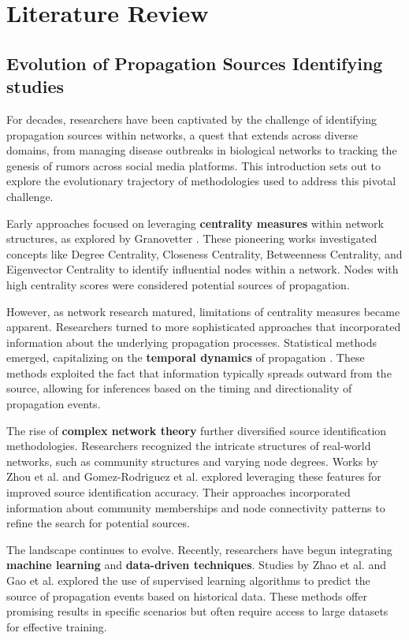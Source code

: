 \chapter{Literature Review}

\section{Evolution of Propagation Sources Identifying studies}
For decades, researchers have been captivated by the challenge of identifying propagation sources within networks, a quest that extends across diverse domains, from managing disease outbreaks in biological networks to tracking the genesis of rumors across social media platforms. This introduction sets out to explore the evolutionary trajectory of methodologies used to address this pivotal challenge.

Early approaches focused on leveraging \textbf{centrality measures} within network structures, as explored by Granovetter \cite{granovetter1973}. These pioneering works investigated concepts like Degree Centrality, Closeness Centrality, Betweenness Centrality, and Eigenvector Centrality to identify influential nodes within a network. Nodes with high centrality scores were considered potential sources of propagation.

However, as network research matured, limitations of centrality measures became apparent. Researchers turned to more sophisticated approaches that incorporated information about the underlying propagation processes. Statistical methods emerged, capitalizing on the \textbf{temporal dynamics} of propagation \cite{liu2011, chen2010}. These methods exploited the fact that information typically spreads outward from the source, allowing for inferences based on the timing and directionality of propagation events.

The rise of \textbf{complex network theory} further diversified source identification methodologies. Researchers recognized the intricate structures of real-world networks, such as community structures and varying node degrees. Works by Zhou et al. \cite{zhou2008} and Gomez-Rodriguez et al. \cite{gomez2011} explored leveraging these features for improved source identification accuracy. Their approaches incorporated information about community memberships and node connectivity patterns to refine the search for potential sources.

The landscape continues to evolve. Recently, researchers have begun integrating \textbf{machine learning} and \textbf{data-driven techniques}. Studies by Zhao et al. \cite{zhao2016} and Gao et al. \cite{gao2018} explored the use of supervised learning algorithms to predict the source of propagation events based on historical data. These methods offer promising results in specific scenarios but often require access to large datasets for effective training.

